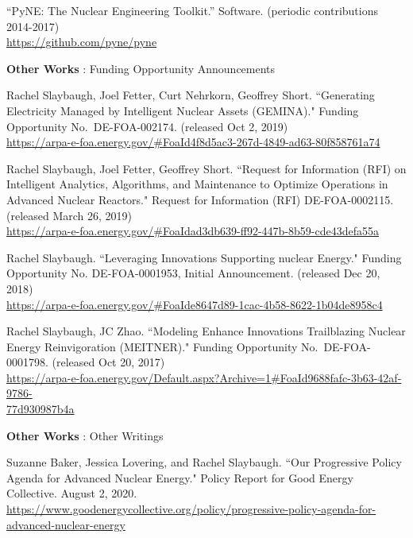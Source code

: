 \begin{bibsection}
\item “PyNE: The Nuclear Engineering Toolkit.” Software. (periodic contributions 2014-2017) \\
\url{https://github.com/pyne/pyne}

\item \textbf{Other Works} : Funding Opportunity Announcements
\item Rachel Slaybaugh, Joel Fetter, Curt Nehrkorn, Geoffrey Short. ``Generating Electricity Managed by Intelligent Nuclear
Assets (GEMINA)." Funding Opportunity No.\ DE-FOA-002174. (released Oct 2, 2019)\\
\url{https://arpa-e-foa.energy.gov/#FoaId4f8d5ac3-267d-4849-ad63-80f858761a74}

\item Rachel Slaybaugh, Joel Fetter, Geoffrey Short. ``Request for Information (RFI) on Intelligent Analytics, Algorithms, and Maintenance to Optimize Operations in Advanced Nuclear Reactors." Request for Information (RFI) DE-FOA-0002115. (released March 26, 2019)\\
\url{https://arpa-e-foa.energy.gov/#FoaIdad3db639-ff92-447b-8b59-cde43defa55a}

\item Rachel Slaybaugh. ``Leveraging Innovations Supporting nuclear Energy." Funding Opportunity No. DE-FOA-0001953, Initial Announcement. (released Dec 20, 2018)\\
\url{https://arpa-e-foa.energy.gov/#FoaIde8647d89-1cac-4b58-8622-1b04de8958c4}

\item Rachel Slaybaugh, JC Zhao. ``Modeling Enhance Innovations Trailblazing Nuclear Energy Reinvigoration (MEITNER)." Funding Opportunity No.\ DE-FOA-0001798. (released Oct 20, 2017)\\
\url{https://arpa-e-foa.energy.gov/Default.aspx?Archive=1#FoaId9688fafc-3b63-42af-9786-}\\ \url{77d930987b4a}

\item \textbf{Other Works} : Other Writings
\item Suzanne Baker, Jessica Lovering, and Rachel Slaybaugh. ``Our Progressive Policy Agenda for Advanced Nuclear Energy." Policy Report for Good Energy Collective. August 2, 2020. \url{https://www.goodenergycollective.org/policy/progressive-policy-agenda-for-advanced-nuclear-energy}



\end{bibsection}

